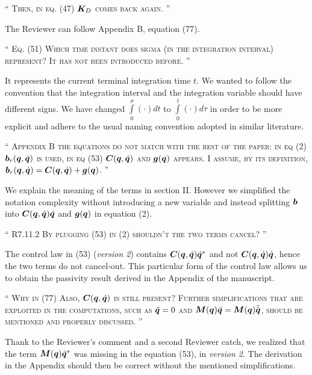 \documentclass[10pt]{article}
\newcommand{\referee}[1]{\;
  \begin{minipage}[t]{.95\textwidth}
    ``{\small\color{red} \textsc{#1}}''
  \end{minipage}\medskip
  }
\newcommand{\version}[1]{\textit{version #1}}
\begin{document}
\begin{enumerate}[label={[R7:\,\arabic{enumi}]}]
\item\label{reply:R7:21} 
\referee{Then, in eq. (47) $\bm{K}_D$ comes back again. }

The Reviewer can follow Appendix B, equation (77).


\item\label{reply:R7:22} 
\referee{Eq. (51) Which time instant does sigma (in the integration interval) represent? It has not been introduced before. }

It represents the current terminal integration time $t$. We wanted to follow the convention that the integration interval and the integration variable should have different signs. We have changed $\int\limits^{\sigma}_0 (\cdot) dt$ to $\int\limits^{t}_0 (\cdot) d\tau$ in order to be more explicit and adhere to the usual naming convention adopted in similar literature.


\item\label{reply:R7:23} 
\referee{Appendix B the equations do not match with the rest of the paper: in eq (2) $\bm{b}_{r}(\bm{q}, \dot{\bm{q}})$ is used, in eq (53) $\bm{C}(\bm{q}, \dot{\bm{q}})$ and $\bm{g}(\bm{q})$ appears. I assume, by its definition,$\bm{b}_{r}(\bm{q}, \dot{\bm{q}}) = \bm{C}(\bm{q}, \dot{\bm{q}}) + \bm{g}(\bm{q})$. 
}

We explain the meaning of the terms in section II. However we simplified the notation complexity without introducing a new variable and instead splitting $\bm{b}$ into $\bm{C}(\bm{q}, \dot{\bm{q}}) \dot{\bm{q}}$ and $\bm{g}(\bm{q})$ in equation (2).

\item\label{reply:R7:24} 
\referee{R7.11.2 By plugging (53) in (2) shouldn't the two terms cancel? 
}

The control law in (53) (\version{2}) contains $\bm{C}(\bm{q}, \dot{\bm{q}}) \dot{\bm{q}}^*$ and not $\bm{C}(\bm{q}, \dot{\bm{q}}) \dot{\bm{q}}$, hence the two terms do not cancel-out. This particular form of the control law allows us to obtain the passivity result derived in the Appendix of the manuscript.

\item\label{reply:R7:25} 
\referee{Why in (77) Also, $\bm{C}(\bm{q}, \dot{\bm{q}})$ is still present? Further simplifications that are exploited in the computations, such as $\ddot{\bm{q}} = 0$ and  $\bm{M}(\bm{q}) \ddot{\bm{q}} = \bm{M}(\bm{q}) \ddot{\tilde{\bm{q}}}$, should be mentioned and properly discussed. 
}

Thank to the Reviewer's comment and a second Reviewer catch, we realized that the term $\bm{M}(\bm{q}) \ddot{\bm{q}}^*$ was missing in the equation (53), in \version{2}. The derivation in the Appendix should then be correct without the mentioned simplifications.


\end{enumerate}
\end{document}
